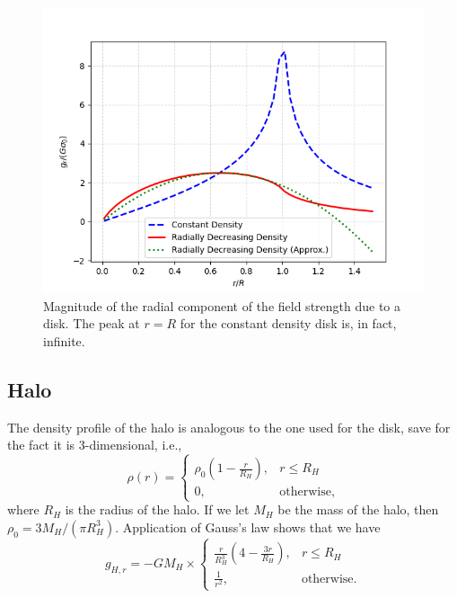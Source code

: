 \begin{figure}[htp]
    \centering
    \includegraphics[scale=0.6]{chapters/test-models/img/disk-field.png}
    \caption{Magnitude of the radial component of the field strength due to a disk.
        The peak at $r=R$ for the constant density disk is, in fact, infinite.}
    \label{fig:radial-strength-disk}
\end{figure}

\subsection{Halo}
The density profile of the halo is analogous to the one used for the disk, save for the fact it is 3-dimensional, i.e.,
\begin{equation*}
    \rho(r) =
    \begin{cases}
        \rho_0\left(1 - \frac{r}{R_H}\right), & r \leq R_H        \\
        0,                                    & \text{otherwise},
    \end{cases}
\end{equation*}
where $R_H$ is the radius of the halo.
If we let $M_H$ be the mass of the halo, then $\rho_0 = 3M_H / (\pi R_H^3)$.
Application of Gauss's law shows that we have
\begin{equation*}
    g_{H,r} = -G M_H \times
    \begin{cases}
        \frac{r}{R_H^3}\left(4 - \frac{3r}{R_H}\right), & r \leq R_H        \\
        \frac{1}{r^2},                                  & \text{otherwise}.
    \end{cases}
\end{equation*}

